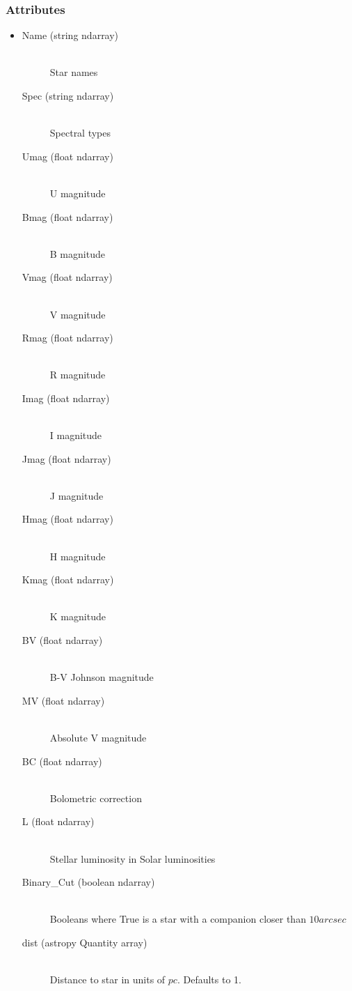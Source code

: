 \documentclass[cleanfoot]{asme2ej}
\begin{document}
\subsubsection*{Attributes}
\begin{itemize}
\item 
\begin{description}
    \item[Name (string ndarray)] \hfill \\ Star names
    \item[Spec (string ndarray)] \hfill \\ Spectral types
    \item[Umag (float ndarray)] \hfill \\ U magnitude
    \item[Bmag (float ndarray)] \hfill \\ B magnitude
    \item[Vmag (float ndarray)] \hfill \\ V magnitude
    \item[Rmag (float ndarray)] \hfill \\ R magnitude
    \item[Imag (float ndarray)] \hfill \\ I magnitude
    \item[Jmag (float ndarray)] \hfill \\ J magnitude
    \item[Hmag (float ndarray)] \hfill \\ H magnitude
    \item[Kmag (float ndarray)] \hfill \\ K magnitude
    \item[BV (float ndarray)] \hfill \\ B-V Johnson magnitude
    \item[MV (float ndarray)] \hfill \\ Absolute V magnitude
    \item[BC (float ndarray)] \hfill \\ Bolometric correction
    \item[L (float ndarray)] \hfill \\ Stellar luminosity in Solar luminosities
    \item[Binary\_Cut (boolean ndarray)] \hfill \\ Booleans where True is a star with a companion closer than $ 10 arcsec $
    \item[dist (astropy Quantity array)] \hfill \\ Distance to star in units of $ pc $. Defaults to 1.

\end{description}
\end{itemize}
\end{document}

